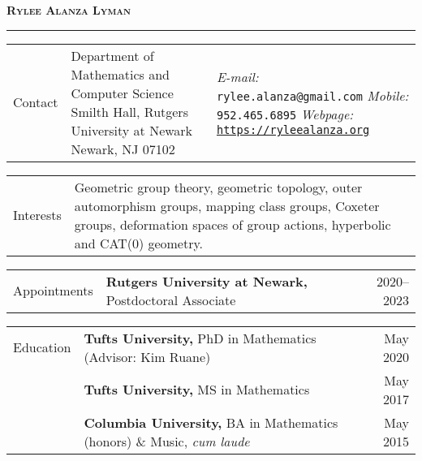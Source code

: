 \documentclass[10pt,letterpaper]{article}
\begin{document}
{\noindent\Huge \textsc{\bfseries Rylee Alanza Lyman}}
\vspace{0.5pc}
\hfill\hrule
\vspace{.5pc}

\begin{tabularx}{\textwidth}{HXp{2.7in}}
  Contact & 
  Department of Mathematics and Computer Science\newline
  Smilth Hall, Rutgers University at Newark\newline
  Newark, NJ 07102 &
  \emph{E-mail:} \texttt{rylee.alanza@gmail.com}\newline
  \emph{Mobile:} \texttt{952.465.6895}\newline
  \emph{Webpage:} \href{https://ryleealanza.org}{\texttt{https://ryleealanza.org}}
\end{tabularx}

\begin{tabularx}{\textwidth}{HX}
  Interests &
  Geometric group theory, geometric topology,
  outer automorphism groups, mapping class groups,
  Coxeter groups,
  deformation spaces of group actions,
  hyperbolic and CAT(0) geometry.
\end{tabularx}

\begin{tabularx}{\textwidth}{HXr}
	Appointments 
	& \textbf{Rutgers University at Newark,} Postdoctoral Associate
	& 2020--2023
\end{tabularx}

\begin{tabularx}{\textwidth}{HXr}
  Education & \textbf{Tufts University,} PhD in Mathematics 
  (Advisor: Kim Ruane) & May 2020 \\
  & \textbf{Tufts University,} MS in Mathematics & May 2017 \\
  & \textbf{Columbia University,}
  BA in Mathematics (honors) \& Music, \emph{cum laude} & May 2015
\end{tabularx}
\end{document}
